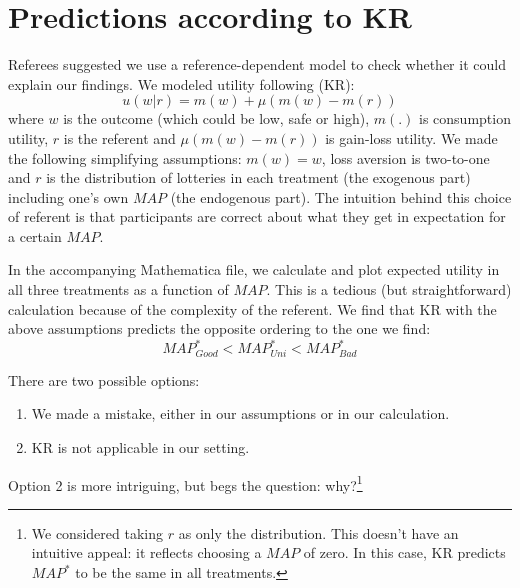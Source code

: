 \documentclass[12pt, a4paper]{article}
\begin{document}
\section{Predictions according to KR}

Referees suggested we use a reference-dependent model to check whether it could explain our findings.
We modeled utility following \cite{Koszegi2007} (KR): $$u(w|r)=m(w)+\mu(m(w)-m(r))$$
where $w$ is the outcome (which could be low, safe or high), $m(.)$ is consumption utility, $r$ is the referent and $\mu(m(w)-m(r))$ is gain-loss utility.
We made the following simplifying assumptions: $m(w)=w$, loss aversion is two-to-one and $r$ is the distribution of lotteries in each treatment (the exogenous part) including one's own $MAP$ (the endogenous part).
The intuition behind this choice of referent is that participants are correct about what they get in expectation for a certain $MAP$.

In the accompanying Mathematica file, we calculate and plot expected utility in all three treatments as a function of $MAP$.
This is a tedious (but straightforward) calculation because of the complexity of the referent.
We find that KR with the above assumptions predicts the opposite ordering to the one we find: $$MAP^*_{Good} < MAP^*_{Uni} < MAP^*_{Bad}$$

There are two possible options:
\begin{enumerate}
 \item We made a mistake, either in our assumptions or in our calculation.
 \item KR is not applicable in our setting.
\end{enumerate}
Option 2 is more intriguing, but begs the question: why?\footnote{
We considered taking $r$ as only the distribution.
This doesn't have an intuitive appeal: it reflects choosing a $MAP$ of zero.
In this case, KR predicts $MAP^*$ to be the same in all treatments.
}

\clearpage
\pagebreak


\end{document}
